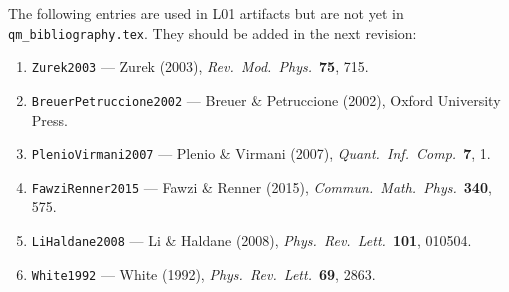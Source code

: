 \documentclass[11pt,a4paper]{article}
\begin{document}
\begin{tcolorbox}[goldbox]
The following entries are used in L01 artifacts but are not yet in
\texttt{qm\_bibliography.tex}. They should be added in the next revision:
\begin{enumerate}[leftmargin=1.8em, itemsep=4pt]
  \item \texttt{Zurek2003} --- Zurek (2003), \textit{Rev.\ Mod.\ Phys.}\ \textbf{75}, 715.
  \item \texttt{BreuerPetruccione2002} --- Breuer \& Petruccione (2002), Oxford University Press.
  \item \texttt{PlenioVirmani2007} --- Plenio \& Virmani (2007), \textit{Quant.\ Inf.\ Comp.}\ \textbf{7}, 1.
  \item \texttt{FawziRenner2015} --- Fawzi \& Renner (2015), \textit{Commun.\ Math.\ Phys.}\ \textbf{340}, 575.
  \item \texttt{LiHaldane2008} --- Li \& Haldane (2008), \textit{Phys.\ Rev.\ Lett.}\ \textbf{101}, 010504.
  \item \texttt{White1992} --- White (1992), \textit{Phys.\ Rev.\ Lett.}\ \textbf{69}, 2863.
\end{enumerate}
\end{tcolorbox}
\end{document}
